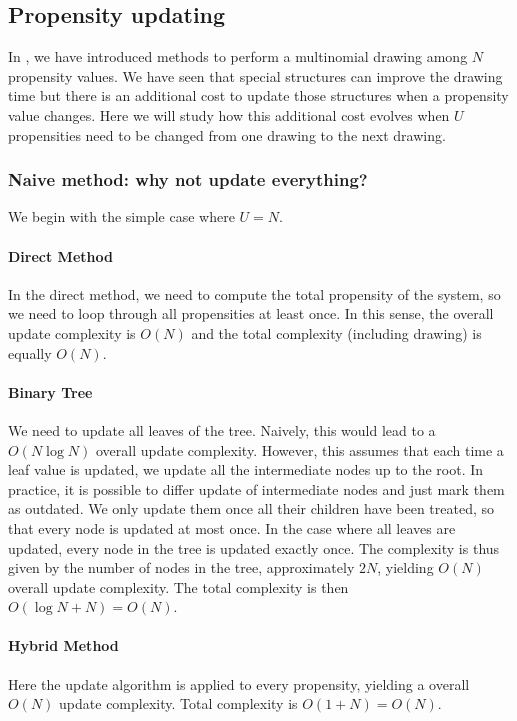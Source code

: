 \subsection{Propensity updating}
\label{sec:reaction_update}

In , we have introduced methods to perform a multinomial drawing among $N$ propensity values.
We have seen that special structures can improve the drawing time
but there is an additional cost to update those structures when a propensity value changes.
Here we will study how this additional cost evolves
when $U$ propensities need to be changed from one drawing to the next drawing.

\subsubsection{Naive method: why not update everything?}

We begin with the simple case where $U = N$.

\paragraph{Direct Method}
In the direct method, we need to compute the total propensity of the system,
so we need to loop through all propensities at least once.
In this sense, the overall update complexity is $O(N)$ and the total complexity (including drawing) is equally $O(N)$.

\paragraph{Binary Tree}
We need to update all leaves of the tree.
Naively, this would lead to a $O(N\log N)$ overall update complexity.
However, this assumes that each time a leaf value is updated, we update all the intermediate nodes up to the root.
In practice, it is possible to differ update of intermediate nodes and just mark them as outdated.
We only update them once all their children have been treated,
so that every node is updated at most once.
In the case where all leaves are updated, every node in the tree is updated exactly once.
The complexity is thus given by the number of nodes in the tree, approximately $2N$,
yielding $O(N)$ overall update complexity.
The total complexity is then $O(\log N + N) = O(N)$.

\paragraph{Hybrid Method}
Here the update algorithm is applied to every propensity, yielding a overall $O(N)$ update complexity.
Total complexity is $O(1 + N) = O(N)$.

